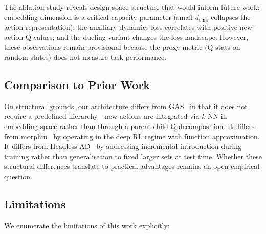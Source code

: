 \documentclass{article}
\begin{document}
The ablation study reveals design-space structure that would inform future
work: embedding dimension is a critical capacity parameter (small
$d_\text{emb}$ collapses the action representation); the auxiliary dynamics
loss correlates with positive new-action Q-values; and the dueling variant
changes the loss landscape. However, these observations remain provisional
because the proxy metric (Q-stats on random states) does not measure task
performance.

\subsection{Comparison to Prior Work}

On structural grounds, our architecture differs from
GAS~\cite{farquhar2020growing} in that it does not require a predefined
hierarchy---new actions are integrated via $k$-NN in embedding space rather
than through a parent-child Q-decomposition. It differs from
morphin~\cite{delarosa2026morphin} by operating in the deep RL regime with
function approximation. It differs from Headless-AD~\cite{sinii2023headless}
by addressing incremental introduction during training rather than
generalisation to fixed larger sets at test time. Whether these structural
differences translate to practical advantages remains an open empirical
question.

\subsection{Limitations}
\label{sec:limitations}

We enumerate the limitations of this work explicitly:
\end{document}
